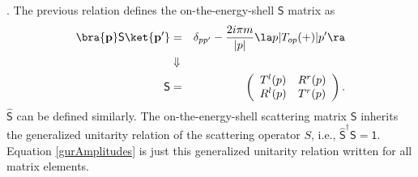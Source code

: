 \cite{Muga2004}. The previous relation defines the on-the-energy-shell $\mathsf{S}$ matrix as
%
\begin{eqnarray}
  \bra{\mathbf{p}} \mathsf{S} \ket{\mathbf{p'}} &=& \delta_{pp'} - \frac{2i\pi m}{|p|} \la p|T_{op}(+)|p'\ra \nonumber \\
  & \Downarrow & \\
  \mathsf{S} &=&
  \left(
  \begin{array}{cc}
    T^l(p)&R^r(p)
    \\
    R^l(p)&T^r(p)
  \end{array}
  \right)\nonumber.
\end{eqnarray}
%
$\mathsf{\widehat{S}}$ can be defined similarly. The on-the-energy-shell scattering matrix $\mathsf{S}$ inherits the generalized unitarity relation of the scattering operator $S$, i.e., $\mathsf{\widehat{S}}^\dagger\mathsf{S} = \mathsf{1}$. Equation \eqref{gurAmplitudes} is just this generalized unitarity relation written for all matrix elements.

